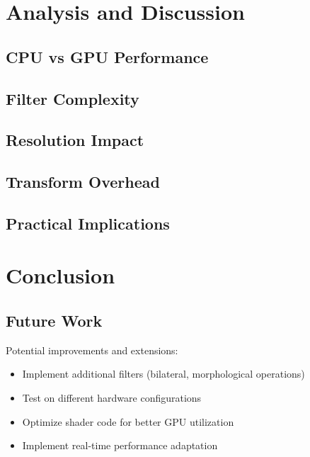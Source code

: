 \documentclass[12pt,a4paper]{article}
\begin{document}

\section{Analysis and Discussion}

\subsection{CPU vs GPU Performance}

\subsection{Filter Complexity}

\subsection{Resolution Impact}

\subsection{Transform Overhead}

\subsection{Practical Implications}

\section{Conclusion}

\subsection{Future Work}
Potential improvements and extensions:
\begin{itemize}
    \item Implement additional filters (bilateral, morphological operations)
    \item Test on different hardware configurations
    \item Optimize shader code for better GPU utilization
    \item Implement real-time performance adaptation
\end{itemize}



\end{document}

